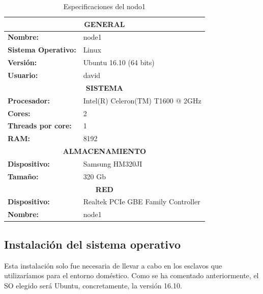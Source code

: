 \begin{table}[htp!]
	\centering
	\caption{Especificaciones del nodo1}
	\label{esclavo}
	\begin{tabular}{|l|l|}
		\hline
		\multicolumn{2}{|c|}{\textbf{GENERAL}}                             			    \\ \hline
		\textbf{Nombre:}            & node1			                         			\\ \hline
		\textbf{Sistema Operativo:} & Linux                                   			\\ \hline
		\textbf{Versión:}           & Ubuntu 16.10 (64 bits)                   			\\ \hline
		\textbf{Usuario:}           & david                         	       			\\ \hline
		\multicolumn{2}{|c|}{\textbf{SISTEMA}}                                 			\\ \hline
		\textbf{Procesador:}        & Intel(R) Celeron(TM) T1600 @ 2GHz  	\\ \hline
		\textbf{Cores:}             & 2                                        			\\ \hline
		\textbf{Threads por core:}  & 1                                        			\\ \hline
		\textbf{RAM:}               & 	8192                                    			\\ \hline
		\multicolumn{2}{|c|}{\textbf{ALMACENAMIENTO}}                          			\\ \hline
		\textbf{Dispositivo:}       & Samsung HM320JI\\ \hline
		\textbf{Tamaño:}            & 320 Gb	                                   			\\ \hline
		\multicolumn{2}{|c|}{\textbf{RED}}                                     			\\ \hline
		\textbf{Dispositivo:}       & Realtek PCIe GBE Family Controller       			\\ \hline
		\textbf{Nombre:}            & node1                                  			\\ \hline
	\end{tabular}
\end{table}

\clearpage
\subsection{Instalación del sistema operativo}
Esta instalación solo fue necesaria de llevar a cabo en los esclavos que utilizaríamos para el entorno doméstico. Como se ha comentado anteriormente, el \gls{SO} elegido será Ubuntu, concretamente, la versión 16.10.

